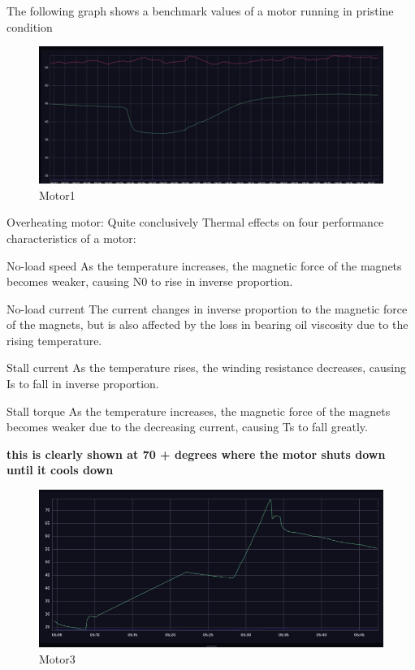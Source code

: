The following graph shows a benchmark values of a motor running in pristine condition




\begin{figure}[!h]
	\includegraphics[width=1.0\linewidth]{Figures/normal_motor}
	\caption{Motor1}
\end{figure}

\pagebreak

Overheating motor: Quite conclusively Thermal effects on four performance characteristics of a motor:

No-load speed
As the temperature increases, the magnetic force of the magnets becomes weaker, causing N0 to rise in inverse proportion.

No-load current
The current changes in inverse proportion to the magnetic force of the magnets, but is also affected by the loss in bearing oil viscosity due to the rising temperature.

Stall current
As the temperature rises, the winding resistance decreases, causing Is to fall in inverse proportion.

Stall torque
As the temperature increases, the magnetic force of the magnets becomes weaker due to the decreasing current, causing Ts to fall greatly.


\textbf{this is clearly shown at 70 + degrees where the motor shuts down until it cools down}



\begin{figure}[!h]
	\includegraphics[width=1.0\linewidth]{Figures/overheating_motor}
	\caption{Motor3}
\end{figure}

